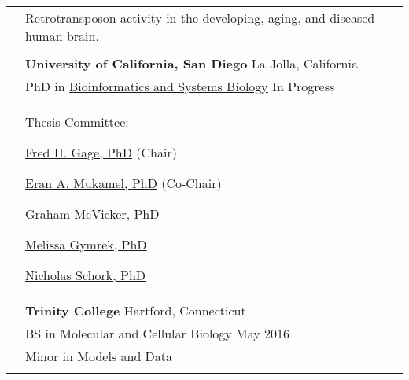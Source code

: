 \documentclass[letterpaper, 11pt]{article}
\begin{document}
\begin{longtable}{p{1.6in}p{4.9in}}


\nohyphens{\color{OliveGreen}{Research interests}}
& Retrotransposon activity in the developing, aging, and diseased human brain. \\
& \\


\color{OliveGreen}{Education} 
& \textbf{University of California, San Diego} \hfill La Jolla, California \\ 
& PhD in \href{https://bioinformatics.ucsd.edu/}{Bioinformatics and Systems Biology} \hfill In Progress \\
& Thesis Committee:
\begin{compactitem}
\item \href{https://www.salk.edu/scientist/rusty-gage/}{Fred H. Gage, PhD} (Chair)
\item \href{https://cogsci.ucsd.edu/people/faculty/eran-mukamel.html}{Eran A. Mukamel, PhD} (Co-Chair)
\item \href{https://www.salk.edu/scientist/graham-mcvicker/}{Graham McVicker, PhD}
\item \href{https://profiles.ucsd.edu/melissa.gymrek}{Melissa Gymrek, PhD}
\item \href{https://www.tgen.org/faculty-profiles/nik-schork/}{Nicholas Schork, PhD}
\end{compactitem} \\


& \textbf{Trinity College} \hfill Hartford, Connecticut \\
& BS in Molecular and Cellular Biology \hfill May 2016 \\
& Minor in Models and Data \\
& \\



\end{longtable}
\end{document}
